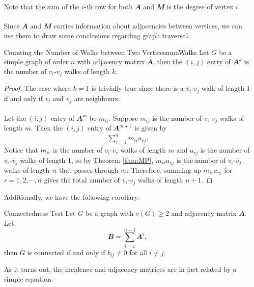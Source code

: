 \documentclass[math, code]{amznotes}
\theoremstyle{remark}
\begin{document}
\\\\
Note that the sum of the $i$-th row for both $\mathbfit{A}$ and $\mathbfit{M}$ is the degree of vertex $i$. 
\\\\
Since $\mathbfit{A}$ and $\mathbfit{M}$ carries information about adjacencies between vertices, we can use them to draw some conclusions regarding graph traversal.
\begin{probox}{Counting the Number of Walks between Two Vertices}{numWalks}
    Let $G$ be a simple graph of order $n$ with adjacency matrix $\mathbfit{A}$, then the $(i, j)$ entry of $\mathbfit{A}^k$ is the number of $v_i$-$v_j$ walks of length $k$.
    \tcblower   
    \begin{proof}
        The case where $k = 1$ is trivially true since there is a $v_i$-$v_j$ walk of length $1$ if and only if $v_i$ and $v_j$ are neighbours.
        \\\\
        Let the $(i, j)$ entry of $\mathbfit{A}^m$ be $m_{ij}$. Suppose $m_{ij}$ is the number of $v_i$-$v_j$ walks of length $m$. Then the $(i, j)$ entry of $\mathbfit{A}^{m + 1}$ is given by
        \begin{align*}
            \sum_{r = 1}^{n}m_{ir}a_{rj}.
        \end{align*}
        Notice that $m_{ir}$ is the number of $v_i$-$v_r$ walks of length $m$ and $a_{rj}$ is the number of $v_r$-$v_j$ walks of length $1$, so by Theorem \ref{thm:MP}, $m_{ir}a_{rj}$ is the number of $v_i$-$v_j$ walks of length~$n$ that passes through $v_r$. Therefore, summing up $m_{ir}a_{rj}$ for $r = 1, 2, \cdots, n$ gives the total number of $v_i$-$v_j$ walks of length $n + 1$.
    \end{proof}
\end{probox}
Additionally, we have the following corollary:
\begin{corbox}{Connectedness Test}{}
    Let $G$ be a graph with $v(G) \geq 2$ and adjacency matrix $\mathbfit{A}$. Let
    \begin{equation*}
        \mathbfit{B} = \sum_{i = 1}^{n - 1}\mathbfit{A}^i,
    \end{equation*}
    then $G$ is connected if and only if $b_{ij} \neq 0$ for all $i \neq j$.
\end{corbox}
As it turns out, the incidence and adjacency matrices are in fact related by a simple equation.
\end{document}
